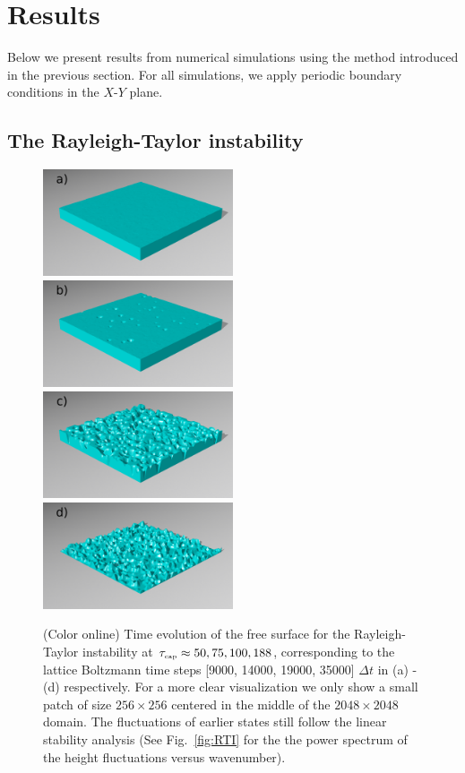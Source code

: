 \section{Results}\label{sec:results}
Below we present results from numerical simulations using the method introduced in the previous section. For all simulations, we apply periodic boundary conditions in the $X$-$Y$ plane.
\subsection{The Rayleigh-Taylor instability}

\begin{figure}
    \includegraphics[width=0.5\textwidth]{graphics/Fig_2_1_rti_renders_a).png}
    \includegraphics[width=0.5\textwidth]{graphics/Fig_2_2_rti_renders_b).png}
    \includegraphics[width=0.5\textwidth]{graphics/Fig_2_3_rti_renders_c).png}
    \includegraphics[width=0.5\textwidth]{graphics/Fig_2_4_rti_renders_d).png}
  \caption{(Color online) Time evolution of the free surface for the Rayleigh-Taylor instability at $\tau_{\mbox{\tiny{cap}}}\approx50, 75, 100, 188$, corresponding to the lattice Boltzmann time steps [9000, 14000, 19000, 35000] $\Delta t$ in (a) - (d) respectively. For a more clear visualization we only show a small patch of size $256\times256$ centered in the middle of the $2048\times 2048$ domain. The fluctuations of earlier states still follow the linear stability analysis (See Fig.~\ref{fig:RTI} for the the power
spectrum  of the  height fluctuations versus wavenumber).}
  \label{fig:RTI_evolution}
\end{figure}


